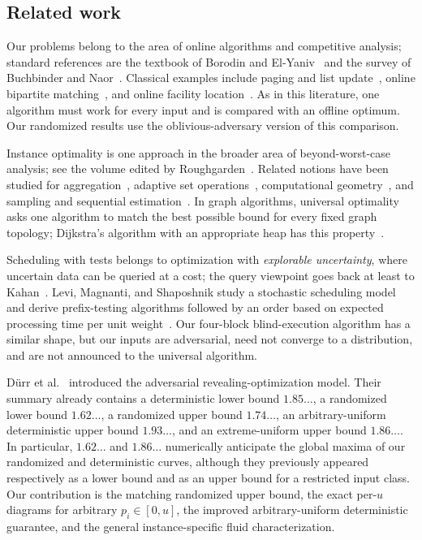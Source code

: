 \subsection{Related work}
\label{sec:related}

Our problems belong to the area of online algorithms and competitive
analysis; standard references are the textbook of Borodin and
El-Yaniv~\cite{BorodinElYaniv1998} and the survey of Buchbinder and
Naor~\cite{BuchbinderNaor2009}.  Classical examples include paging and list
update~\cite{SleatorTarjan1985}, online bipartite
matching~\cite{KarpVaziraniVazirani1990}, and online facility
location~\cite{Meyerson2001}.  As in this literature, one algorithm must work
for every input and is compared with an offline optimum.  Our randomized
results use the oblivious-adversary version of this comparison.  

\pagebreak[3]

Instance optimality is one approach in the broader area of beyond-worst-case
analysis; see the volume edited by Roughgarden~\cite{Roughgarden2021}.
Related notions have been studied for aggregation~\cite{FaginLotemNaor2003},
adaptive set operations~\cite{DemaineLopezOrtizMunro2000}, computational
geometry~\cite{AfshaniBarbayChan2017}, and sampling and sequential
estimation~\cite{NarayananRozhonTetekThorup2024}.  In graph algorithms,
universal optimality asks one algorithm to match the best possible bound for
every fixed graph topology; Dijkstra's algorithm with an appropriate heap has
this property~\cite{HaeuplerHladikRozhonTarjanTetek2024}.

Scheduling with tests belongs to optimization with \emph{explorable
uncertainty}, where uncertain data can be queried at a cost; the query
viewpoint goes back at least to Kahan~\cite{Kahan1991}.  Levi, Magnanti, and
Shaposhnik study a stochastic scheduling model and derive prefix-testing
algorithms followed by an order based on expected processing time per unit
weight~\cite{LeviMagnantiShaposhnik2019,LeviMagnantiShaposhnik2024}.  Our
four-block blind-execution algorithm has a similar shape, but our inputs are
adversarial, need not converge to a distribution, and are not announced to
the universal algorithm.

D{\"u}rr et al.~\cite{DurrErlebachMegowMeissner2020} introduced the
adversarial revealing-optimization model.  Their summary already
contains a deterministic lower bound $1.85\ldots$, a randomized lower bound
$1.62\ldots$, a randomized upper bound $1.74\ldots$, an arbitrary-uniform
deterministic upper bound $1.93\ldots$, and an extreme-uniform upper bound
$1.86\ldots$.  In particular, $1.62\ldots$ and $1.86\ldots$ numerically anticipate the
global maxima of our randomized and deterministic curves, although they
previously appeared respectively as a lower bound and as an upper bound for
a restricted input class.  Our contribution is the matching randomized
upper bound, the exact per-$u$ diagrams for arbitrary $p_i\in[0,u]$, the
improved arbitrary-uniform deterministic guarantee, and the general
instance-specific fluid characterization.

